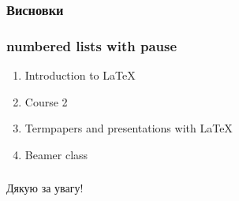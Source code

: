 \documentclass[12pt]{beamer}
\begin{document}
\begin{frame}\frametitle{Висновки }
\end{frame}

\begin{frame}\frametitle{numbered lists with pause}
	\begin{enumerate}
		\item Introduction to  \LaTeX \pause 
		\item Course 2 \pause 
		\item Termpapers and presentations with \LaTeX \pause 
		\item Beamer class
	\end{enumerate}
\end{frame}

\begin{frame}\frametitle{ }
	Дякую за увагу!
\end{frame}
\end{document}
